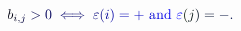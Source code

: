 \documentclass[12pt]{article}
\begin{document}
\makeatletter
\renewcommand*{\@textcolor}[3]{%
  \protect\leavevmode
  \begingroup
    \color#1{#2}#3%
  \endgroup
}
\makeatother
\begin{displaymath}
\mathcolor[RGB]{0,0,15}{b} _ { \mathcolor[RGB]{0,0,30}{i} \mathcolor[RGB]{0,0,45}{,} \mathcolor[RGB]{0,0,60}{j} } \mathcolor[RGB]{0,0,75}{>} \mathcolor[RGB]{0,0,90}{0} \mathcolor[RGB]{0,0,105}{\iff} \mathcolor[RGB]{0,0,120}{\varepsilon} \mathcolor[RGB]{0,0,135}{(} \mathcolor[RGB]{0,0,150}{i} \mathcolor[RGB]{0,0,165}{)} \mathcolor[RGB]{0,0,180}{=} \mathcolor[RGB]{0,0,195}{+} \mathrm { ~ \mathcolor[RGB]{0,0,210}{a} \mathcolor[RGB]{0,0,225}{n} \mathcolor[RGB]{0,0,240}{d} ~ } \mathcolor[RGB]{0,0,255}{\varepsilon} \mathcolor[RGB]{0,15,0}{(} \mathcolor[RGB]{0,15,15}{j} \mathcolor[RGB]{0,15,30}{)} \mathcolor[RGB]{0,15,45}{=} \mathcolor[RGB]{0,15,60}{-} \mathcolor[RGB]{0,15,75}{.}
\end{displaymath}
\end{document}
